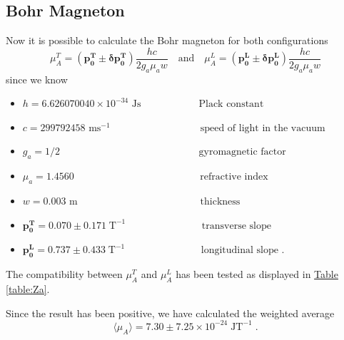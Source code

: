 \documentclass[a4paper,12pt,abstracton]{scrartcl}
\begin{document}
\subsection{Bohr Magneton}
Now it is possible to calculate the Bohr magneton for both configurations $$\mu_A^T= (\boldsymbol{p_0^T}\pm \boldsymbol{\delta p_0^T})\frac{hc}{2g_a\mu_a w} \quad\text{and}\quad \mu_A^L= (\boldsymbol{p_0^L}\pm \boldsymbol{\delta p_0^L})\frac{hc}{2g_a\mu_a w}$$ 
 since we know 
\begin{itemize}
\item $h=6.626070040\times10^{-34} \text{ Js}  \;\,\quad\qquad\qquad\text{ Plack constant}$  
\item $c=299792458 \text{ ms}^{-1}  \quad\qquad\qquad\qquad\qquad\text{speed of light in the vacuum}$
\item $g_a=1/2   \;\;\quad\qquad\qquad\qquad\qquad\qquad\qquad\text{ gyromagnetic factor}$
\item $\mu_a= 1.4560    \;\qquad\qquad\qquad\qquad\qquad\qquad\text{ refractive index}$
\item  $w= 0.003 \text{ m} \;\qquad\qquad\qquad\qquad\qquad\qquad\text{thickness}$
\item $\boldsymbol{p_0^{T}}=0.070 \pm 0.171 \;\text{T}^{-1}
\;\quad\qquad\qquad\qquad\text{ transverse slope}$
\item $\boldsymbol{p_0^{L}}=0.737 \pm 0.433 \;\text{T}^{-1} \;\quad\qquad\qquad\qquad\text{ longitudinal slope .}$\newline
\end{itemize} 

The compatibility between $\mu_A^T$ and $\mu_A^L$ has been tested as displayed in \hyperref[table:Za]{Table \ref*{table:Za}}. 
\begin{table}[H]
\caption{}
\centering
{}
\label{table:Za}
\end{table}

Since the result has been positive, we have calculated the weighted average $$ \langle \mu_A\rangle=7.30 \pm 7.25\times 10^{-24}\;\text{JT}^{-1}\;.$$

\end{document}
